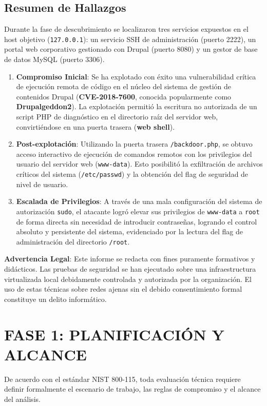 \documentclass[11pt,a4paper]{article}
\begin{document}
\subsection{Resumen de Hallazgos}
Durante la fase de descubrimiento se localizaron tres servicios expuestos en el host objetivo (\texttt{127.0.0.1}): un servicio SSH de administración (puerto 2222), un portal web corporativo gestionado con Drupal (puerto 8080) y un gestor de base de datos MySQL (puerto 3306).
\begin{enumerate}
    \item \textbf{Compromiso Inicial}: Se ha explotado con éxito una vulnerabilidad crítica de ejecución remota de código en el núcleo del sistema de gestión de contenidos Drupal (\textbf{CVE-2018-7600}, conocida popularmente como \textbf{Drupalgeddon2}). La explotación permitió la escritura no autorizada de un script PHP de diagnóstico en el directorio raíz del servidor web, convirtiéndose en una puerta trasera (\textbf{web shell}).
    \item \textbf{Post-explotación}: Utilizando la puerta trasera \texttt{/backdoor.php}, se obtuvo acceso interactivo de ejecución de comandos remotos con los privilegios del usuario del servidor web (\texttt{www-data}). Esto posibilitó la exfiltración de archivos críticos del sistema (\texttt{/etc/passwd}) y la obtención del flag de seguridad de nivel de usuario.
    \item \textbf{Escalada de Privilegios}: A través de una mala configuración del sistema de autorización \texttt{sudo}, el atacante logró elevar sus privilegios de \texttt{www-data} a \texttt{root} de forma directa sin necesidad de introducir contraseñas, logrando el control absoluto y persistente del sistema, evidenciado por la lectura del flag de administración del directorio \texttt{/root}.
\end{enumerate}

\begin{warnbox}
\textbf{Advertencia Legal}: Este informe se redacta con fines puramente formativos y didácticos. Las pruebas de seguridad se han ejecutado sobre una infraestructura virtualizada local debidamente controlada y autorizada por la organización. El uso de estas técnicas sobre redes ajenas sin el debido consentimiento formal constituye un delito informático.
\end{warnbox}


\section{FASE 1: PLANIFICACIÓN Y ALCANCE}
De acuerdo con el estándar NIST 800-115, toda evaluación técnica requiere definir formalmente el escenario de trabajo, las reglas de compromiso y el alcance del análisis.
\end{document}
